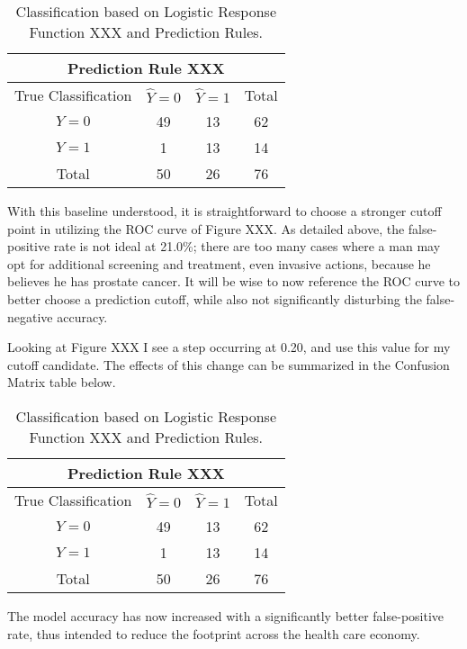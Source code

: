 \begin{table}[H]
	\centering
	\begin{tabular}{ |c||c|c||c|  }
 	\hline
 	\multicolumn{4}{|c|}{Prediction Rule XXX} \\
 	\hline\hline
 	True Classification&\(\hat{Y}=0\)&\(\hat{Y}=1\)&Total\\
 	\hline
 	\(Y=0\)&49&13&62\\
 	\(Y=1\)&1&13&14\\
 	\hline\hline
 	Total&50&26&76\\
 	\hline
	\end{tabular}
 	\caption{Classification based on Logistic Response Function XXX and Prediction Rules.}
\end{table}

With this baseline understood, it is straightforward to choose a stronger cutoff point in utilizing the ROC curve of Figure XXX. As detailed above, the false-positive rate is not ideal at 21.0\%; there are too many cases where a man may opt for additional screening and treatment, even invasive actions, because he believes he has prostate cancer. It will be wise to now reference the ROC curve to better choose a prediction cutoff, while also not significantly disturbing the false-negative accuracy. \par

Looking at Figure XXX I see a step occurring at 0.20, and use this value for my cutoff candidate. The effects of this change can be summarized in the Confusion Matrix table below.

\begin{table}[H]
	\centering
	\begin{tabular}{ |c||c|c||c| }
 	\hline
 	\multicolumn{4}{|c|}{Prediction Rule XXX} \\
 	\hline\hline
 	True Classification&\(\hat{Y}=0\)&\(\hat{Y}=1\)&Total\\
 	\hline
 	\(Y=0\)&49&13&62\\
 	\(Y=1\)&1&13&14\\
 	\hline\hline
 	Total&50&26&76\\
 	\hline
	\end{tabular}
 	\caption{Classification based on Logistic Response Function XXX and Prediction Rules.}
\end{table}

The model accuracy has now increased with a significantly better false-positive rate, thus intended to reduce the footprint across the health care economy. \par

